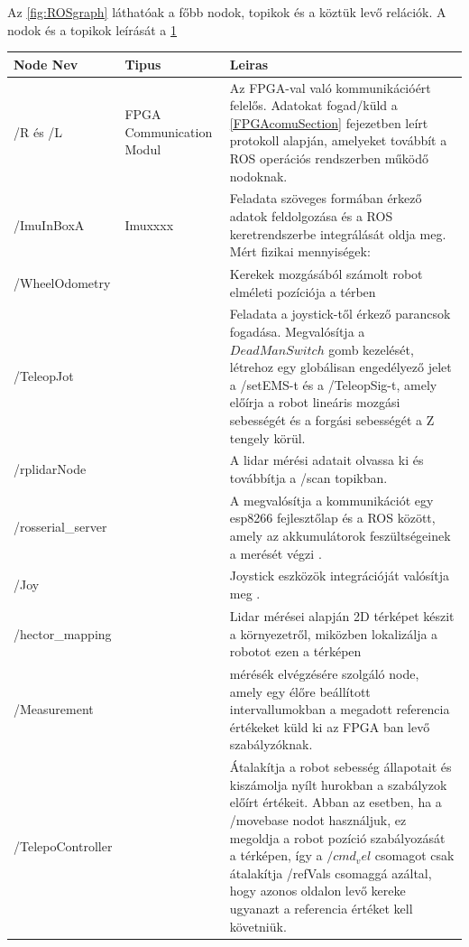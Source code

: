 Az \ref{fig:ROSgraph} láthatóak a főbb nodok, topikok és a köztük levő relációk. A nodok és a topikok leírását a \ref{Tab:nodok}

\begin{table}[H]
\centering
\begin{tabular}{lp{3cm}p{8cm}}
\hline Node Nev & Tipus & Leiras \\ \hline
  /R és /L      &  FPGA
  Communication
  Modul     &  Az FPGA-val való kommunikációért felelős. Adatokat fogad/küld  a \ref{FPGAcomuSection} fejezetben leírt protokoll alapján, amelyeket továbbít a ROS operációs rendszerben működő nodoknak.     \\
  /ImuInBoxA       &    Imuxxxx   &  Feladata szöveges formában érkező adatok feldolgozása és a ROS keretrendszerbe integrálását oldja meg. Mért fizikai mennyiségek:       \\
  /WheelOdometry       &       &   Kerekek mozgásából számolt robot elméleti pozíciója a térben     \\
  /TeleopJot      &       & Feladata a joystick-től érkező parancsok fogadása. Megvalósítja a $Dead Man Switch$ gomb kezelését, létrehoz egy globálisan engedélyező jelet a /setEMS-t és a /TeleopSig-t, amely előírja a robot lineáris mozgási sebességét és a forgási sebességét a Z tengely körül.  \\
  /rplidarNode & & A lidar mérési adatait olvassa ki és továbbítja a /scan topikban.\\
  /rosserial\_server & & A megvalósítja a kommunikációt egy esp8266 fejlesztőlap és a ROS között, amely az akkumulátorok feszültségeinek a merését végzi \cite{RosSerial}.\\
  /Joy & & Joystick eszközök integrációját valósítja meg \cite{rosjoy}.\\
  /hector\_mapping & & Lidar mérései alapján 2D térképet készit a környezetről, miközben lokalizálja a robotot ezen a térképen \cite{roshectormap}\\
  /Measurement & & mérésék elvégzésére szolgáló node, amely egy élőre beállított intervallumokban a megadott referencia értékeket küld ki az FPGA ban levő szabályzóknak.\\
  /TelepoController & & Átalakítja a robot sebesség állapotait és kiszámolja nyílt hurokban a szabályzok előírt értékeit. Abban az esetben, ha a /movebase nodot használjuk, ez megoldja a robot pozíció szabályozását a térképen, így a $/cmd_vel$ csomagot csak átalakítja /refVals csomaggá azáltal, hogy azonos oldalon levő kereke ugyanazt a referencia értéket kell követniük.
  
\end{tabular}
 \label{Tab:nodok} 
\end{table}

